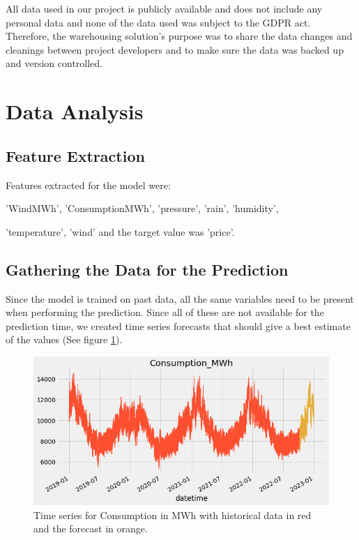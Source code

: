 \documentclass{article}
\begin{document}
All data used in our project is publicly available and does not include any personal data and none of the data used was subject to the GDPR act. Therefore, the warehousing solution's purpose was to share the data changes and cleanings between project developers and to make sure the data was backed up and version controlled.

\section{Data Analysis}
\label{section:analysis}

\subsection{Feature Extraction}
\label{subsection:extraction}

Features extracted for the model were:

'WindMWh', 'ConsumptionMWh', 'pressure', 'rain', 'humidity',

'temperature', 'wind' and the target value was 'price'.


\subsection{Gathering the Data for the Prediction}
\label{subsection:datafilling}

Since the model is trained on past data, all the same variables need to be present when performing the prediction. Since all of these are not available for the prediction time, we created time series forecasts that should give a best estimate of the values (See figure \ref{fig:consumption}).

\begin{figure}
    \centering
    \includegraphics[width=15cm]{report/images/consumption.png}
    \caption{Time series for Consumption in MWh with historical data in red and the forecast in orange.}
    \label{fig:consumption}
\end{figure}
\end{document}
